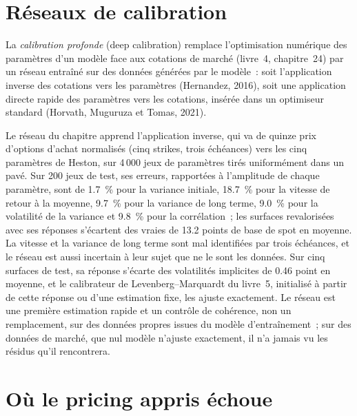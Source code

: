 \section{Réseaux de calibration}

\begin{definition}\label{def:ml:deep-hedging-and-machine-learning-in-pricing:calib}
La \emph{calibration profonde} (deep calibration) remplace l'optimisation numérique des paramètres d'un modèle face aux cotations de marché
(livre~4, chapitre~24) par un réseau entraîné sur des données générées par le modèle~: soit l'application inverse des cotations vers les paramètres (Hernandez,
2016), soit une application directe rapide des paramètres vers les cotations, insérée dans un optimiseur standard (Horvath, Muguruza et Tomas, 2021).
\end{definition}

Le réseau du chapitre apprend l'application inverse, qui va de quinze prix d'options d'achat normalisés (cinq strikes, trois échéances) vers les cinq
paramètres de Heston, sur 4\,000 jeux de paramètres tirés uniformément dans un pavé. Sur 200 jeux de test, ses erreurs, rapportées à l'amplitude de chaque
paramètre, sont de 1.7~\% pour la variance initiale, 18.7~\% pour la vitesse de retour à la moyenne, 9.7~\% pour la variance de long terme,
9.0~\% pour la volatilité de la variance et 9.8~\% pour la corrélation~; les surfaces revalorisées avec ses réponses s'écartent des vraies
de 13.2 points de base de spot en moyenne. La vitesse et la variance de long terme sont mal identifiées par trois échéances, et le réseau
est aussi incertain à leur sujet que ne le sont les données. Sur cinq surfaces de test, sa réponse s'écarte des volatilités implicites de 0.46 point en
moyenne, et le calibrateur de Levenberg--Marquardt du livre~5, initialisé à partir de cette réponse ou d'une estimation fixe, les ajuste exactement. Le réseau est
une première estimation rapide et un contrôle de cohérence, non un remplacement, sur des données propres issues du modèle d'entraînement~; sur des données de marché,
que nul modèle n'ajuste exactement, il n'a jamais vu les résidus qu'il rencontrera.

\section{Où le pricing appris échoue}

